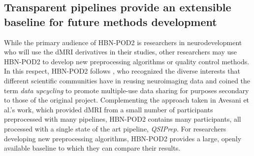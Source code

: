 \documentclass[9pt,lineno]{elife}
\begin{document}
\subsection{Transparent pipelines provide an extensible baseline for future methods development}

While the primary audience of HBN-POD2 is researchers in neurodevelopment who
will use the dMRI derivatives in their studies, other researchers may use
HBN-POD2 to develop new preprocessing algorithms or quality control methods. In
this respect, HBN-POD2 follows \cite{avesani2019-ey}, who
recognized the diverse interests that different scientific communities have in
reusing neuroimaging data and coined the term \emph{data upcycling} to promote
multiple-use data sharing for purposes secondary to those of the original
project. Complementing the approach taken in Avesani et al.'s work, which
provided dMRI from a small number of participants preprocessed with many pipelines,
HBN-POD2 contains many participants, all processed with a single state of the art
pipeline, \emph{QSIPrep}. For researchers developing new preprocessing
algorithms, HBN-POD2 provides a large, openly available baseline to which they
can compare their results.
\end{document}
